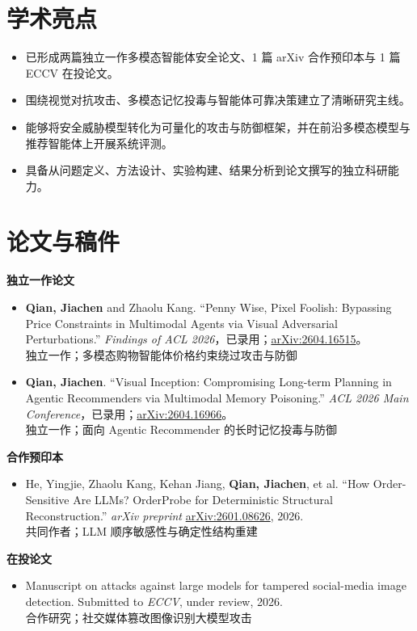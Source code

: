 \documentclass[10pt,a4paper]{ctexart}
\newcommand{\pubentry}[2]{
  \item #1\\[-0.08em]
  {\color{accentsoft}\small #2}
}
\begin{document}
\section*{学术亮点}
\begin{itemize}
  \item 已形成两篇独立一作多模态智能体安全论文、1 篇 arXiv 合作预印本与 1 篇 ECCV 在投论文。
  \item 围绕视觉对抗攻击、多模态记忆投毒与智能体可靠决策建立了清晰研究主线。
  \item 能够将安全威胁模型转化为可量化的攻击与防御框架，并在前沿多模态模型与推荐智能体上开展系统评测。
  \item 具备从问题定义、方法设计、实验构建、结果分析到论文撰写的独立科研能力。
\end{itemize}

\section*{论文与稿件}
\textbf{独立一作论文}
\begin{itemize}
  \pubentry{\textbf{Qian, Jiachen} and Zhaolu Kang. ``Penny Wise, Pixel Foolish: Bypassing Price Constraints in Multimodal Agents via Visual Adversarial Perturbations.'' \textit{Findings of ACL 2026}，已录用；\href{https://arxiv.org/abs/2604.16515}{arXiv:2604.16515}。}{独立一作；多模态购物智能体价格约束绕过攻击与防御}
  \pubentry{\textbf{Qian, Jiachen}. ``Visual Inception: Compromising Long-term Planning in Agentic Recommenders via Multimodal Memory Poisoning.'' \textit{ACL 2026 Main Conference}，已录用；\href{https://arxiv.org/abs/2604.16966}{arXiv:2604.16966}。}{独立一作；面向 Agentic Recommender 的长时记忆投毒与防御}
\end{itemize}

\textbf{合作预印本}
\begin{itemize}
  \pubentry{He, Yingjie, Zhaolu Kang, Kehan Jiang, \textbf{Qian, Jiachen}, et al. ``How Order-Sensitive Are LLMs? OrderProbe for Deterministic Structural Reconstruction.'' \textit{arXiv preprint} \href{https://arxiv.org/abs/2601.08626}{arXiv:2601.08626}, 2026.}{共同作者；LLM 顺序敏感性与确定性结构重建}
\end{itemize}

\textbf{在投论文}
\begin{itemize}
  \pubentry{Manuscript on attacks against large models for tampered social-media image detection. Submitted to \textit{ECCV}, under review, 2026.}{合作研究；社交媒体篡改图像识别大模型攻击}
\end{itemize}
\end{document}
